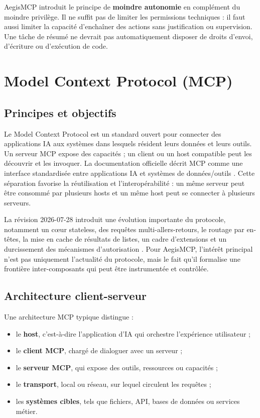 AegisMCP introduit le principe de \textbf{moindre autonomie} en complément du moindre privilège. Il ne suffit pas de limiter les permissions techniques : il faut aussi limiter la capacité d'enchaîner des actions sans justification ou supervision. Une tâche de résumé ne devrait pas automatiquement disposer de droits d'envoi, d'écriture ou d'exécution de code.

\section{Model Context Protocol (MCP)}

\subsection{Principes et objectifs}

Le Model Context Protocol est un standard ouvert pour connecter des applications IA aux systèmes dans lesquels résident leurs données et leurs outils. Un serveur MCP expose des capacités ; un client ou un host compatible peut les découvrir et les invoquer. La documentation officielle décrit MCP comme une interface standardisée entre applications IA et systèmes de données/outils \cite{mcpsdk}. Cette séparation favorise la réutilisation et l'interopérabilité : un même serveur peut être consommé par plusieurs hosts et un même host peut se connecter à plusieurs serveurs.

La révision 2026-07-28 introduit une évolution importante du protocole, notamment un cœur stateless, des requêtes multi-allers-retours, le routage par en-têtes, la mise en cache de résultats de listes, un cadre d'extensions et un durcissement des mécanismes d'autorisation \cite{mcp2026}. Pour AegisMCP, l'intérêt principal n'est pas uniquement l'actualité du protocole, mais le fait qu'il formalise une frontière inter-composants qui peut être instrumentée et contrôlée.

\subsection{Architecture client-serveur}

Une architecture MCP typique distingue :

\begin{itemize}
    \item le \textbf{host}, c'est-à-dire l'application d'IA qui orchestre l'expérience utilisateur ;
    \item le \textbf{client MCP}, chargé de dialoguer avec un serveur ;
    \item le \textbf{serveur MCP}, qui expose des outils, ressources ou capacités ;
    \item le \textbf{transport}, local ou réseau, sur lequel circulent les requêtes ;
    \item les \textbf{systèmes cibles}, tels que fichiers, API, bases de données ou services métier.
\end{itemize}

